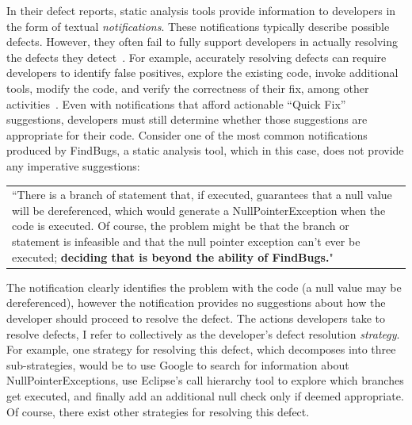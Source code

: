 \documentclass{sig-alternate}
\begin{document}
In their defect reports, static analysis tools provide information to developers in the form of textual \textit{notifications}.
These notifications typically describe possible defects.
However, they often fail to fully support developers in actually resolving the defects they detect~\cite{Johnson2013}.
For example, accurately resolving defects can require developers to identify false positives, explore the existing code, invoke additional tools, modify the code, and verify the correctness of their fix, among other activities~\cite{Smith2015}.  
Even with notifications that afford actionable ``Quick Fix'' suggestions, developers must still determine whether those suggestions are appropriate for their code.
Consider one of the most common \cite{Ayewah2007} notifications produced by FindBugs, a static analysis tool, which in this case, does not provide any imperative suggestions:


\vspace{2mm}

\begin{tabular}{|p{7.5cm}}
	``There is a branch of statement that, if executed, guarantees that a null value will be dereferenced, which would generate a NullPointerException when the code is executed. Of course, the problem might be that the branch or statement is infeasible and that the null pointer exception can't ever be executed; \textbf{deciding that is beyond the ability of FindBugs.}"\\
\end{tabular}
\vspace{2mm}

\noindent
The notification clearly identifies the problem with the code (a null value may be dereferenced), however the notification provides no suggestions about how the developer should proceed to resolve the defect. 
The actions developers take to resolve defects, I refer to collectively as the developer's defect resolution \textit{strategy}.
For example, one strategy for resolving this defect, which decomposes into three sub-strategies, would be to use Google to search for information about NullPointerExceptions, use Eclipse's call hierarchy tool to explore which branches get executed, and finally add an additional null check only if deemed appropriate.
Of course, there exist other strategies for resolving this defect.
\end{document}
